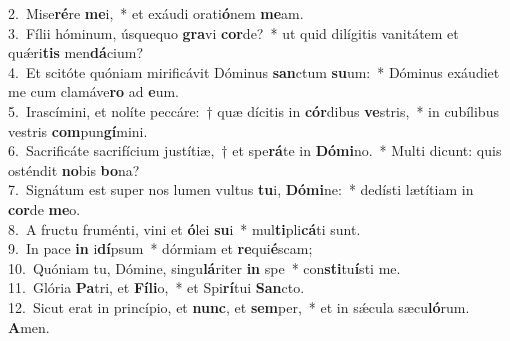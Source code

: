 {2.~}Mise\textbf{ré}re \textbf{me}i,~* et exáudi orati\textbf{ó}nem \textbf{me}am.\\
{3.~}Fílii hóminum, úsquequo \textbf{gra}vi \textbf{cor}de?~* ut quid dilígitis vanitátem et quǽri\textbf{tis} men\textbf{dá}cium?\\
{4.~}Et scitóte quóniam mirificávit Dóminus \textbf{san}ctum \textbf{su}um:~* Dóminus exáudiet me cum clamáve\textbf{ro} ad \textbf{e}um.\\
{5.~}Irascímini, et nolíte peccáre:~† quæ dícitis in \textbf{cór}dibus \textbf{ve}stris,~* in cubílibus vestris \textbf{com}pun\textbf{gí}mini.\\
{6.~}Sacrificáte sacrifícium justítiæ,~† et spe\textbf{rá}te in \textbf{Dó}\textbf{mi}no.~* Multi dicunt: quis osténdit \textbf{no}bis \textbf{bo}na?\\
{7.~}Signátum est super nos lumen vultus \textbf{tu}i, \textbf{Dó}\textbf{mi}ne:~* dedísti lætítiam in \textbf{cor}de \textbf{me}o.\\
{8.~}A fructu fruménti, vini et \textbf{ó}lei \textbf{su}i~* mul\textbf{ti}pli\textbf{cá}ti sunt.\\
{9.~}In pace \textbf{in} i\textbf{dí}psum~* dórmiam et \textbf{re}qui\textbf{é}scam;\\
{10.~}Quóniam tu, Dómine, singu\textbf{lá}riter \textbf{in} spe~* con\textbf{sti}tu\textbf{í}sti me.\\
{11.~}Glória \textbf{Pa}tri, et \textbf{Fí}\textbf{li}o,~* et Spi\textbf{rí}tui \textbf{San}cto.\\
{12.~}Sicut erat in princípio, et \textbf{nunc}, et \textbf{sem}per,~* et in sǽcula sæcu\textbf{ló}rum. \textbf{A}men.\\
